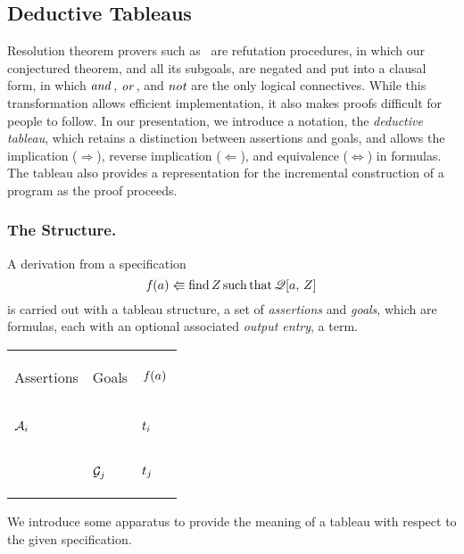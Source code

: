 \documentclass[runningheads]{llncs}
\DeclareMathOperator{\uand}{\emph{and}\,}
\DeclareMathOperator{\uor}{\emph{or}\,}
\DeclareMathOperator{\unot}{\emph{not}\kern-.0pt}
\DeclareMathOperator{\uf}{\emph{f}\,}
\DeclareMathOperator{\uimplies}{\Rightarrow}
\DeclareMathOperator{\uimpliedby}{\Leftarrow}
\DeclareMathOperator{\uiff}{\iff}
\begin{document}
   
      \subsection{Deductive Tableaus}

            Resolution theorem provers such as \SNARK\ are refutation procedures, in which our conjectured theorem, and all its subgoals, are negated and put into a clausal form, in which $\uand$, $\uor$, and $\unot$ are the only logical connectives.  While this transformation allows efficient implementation, it also makes proofs difficult for people to follow. In our presentation, we introduce a notation, the \emph{deductive tableau}, which retains a distinction between assertions and goals, and allows the implication ($\uimplies$), reverse implication ($\uimpliedby$), and equivalence ($\uiff$) in formulas. The tableau also provides a representation for the incremental construction of a program as the proof proceeds.
      
        \subsubsection{The Structure.}   
            A derivation from a specification   \[ \uf(a) \Lleftarrow \operatorname{find} \var{Z} \operatorname{such} \operatorname{that} \mathscr{Q}[a, \, \var{Z}] \]
   is carried out with a tableau structure, a set of \emph{assertions} and \emph{goals}, which are formulas, each with an optional associated \emph{output entry}, a term.   
   \begin{center}
 \begin{tabular}{T}
 \hline
 \begin{center} Assertions \end{center} &  \begin{center} Goals \end{center} & \begin{center} $\,\uf(a)\,$\end{center}  \\ \hhline{|=|=|=|}
 \begin{center}${\mathcal{A}}_{i}$ \end{center} &  & \begin{center}${t}_{i}$\end{center} \\  \hline
         & \begin{center}${\mathcal{G}}_{j}$\end{center} & \begin{center}${t}_{j}$\end{center} \\
 
 \hline
\end{tabular}
\end{center}
 We introduce some apparatus to provide the meaning of a tableau with respect to the given specification.
\end{document}
